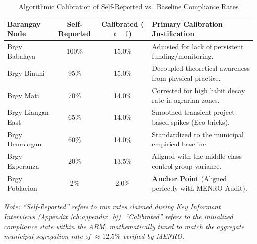 \begin{table}[htbp]
    \centering
    \caption{Algorithmic Calibration of Self-Reported vs.\ Baseline Compliance Rates}
    \label{tab:calibration_data}
    \small
    \begin{tabular}{l c c p{6.5cm}}
        \toprule
        \textbf{Barangay Node} & \textbf{Self-Reported} & \textbf{Calibrated ($t=0$)} & \textbf{Primary Calibration Justification} \\
        \midrule
        Brgy Babalaya     & 100\% & 15.0\% & Adjusted for lack of persistent funding/monitoring. \\
        Brgy Binuni       & 95\%  & 15.0\% & Decoupled theoretical awareness from physical practice. \\
        Brgy Mati         & 70\%  & 14.0\% & Corrected for high habit decay rate in agrarian zones. \\
        Brgy Liangan East & 65\%  & 14.0\% & Smoothed transient project-based spikes (Eco-bricks). \\
        Brgy Demologan    & 60\%  & 14.0\% & Standardized to the municipal empirical baseline. \\
        Brgy Ezperanza    & 20\%  & 13.5\% & Aligned with the middle-class control group variance. \\
        Brgy Poblacion    & 2\%   & 2.0\%  & \textbf{Anchor Point} (Aligned perfectly with MENRO Audit). \\
        \bottomrule
    \end{tabular}
    
    \vspace{1ex}
    \raggedright
    \footnotesize
    \textit{Note: ``Self-Reported'' refers to raw rates claimed during Key Informant Interviews (Appendix \ref{ch:appendix_b}). ``Calibrated'' refers to the initialized compliance state within the ABM, mathematically tuned to match the aggregate municipal segregation rate of $\approx 12.5\%$ verified by MENRO.}
\end{table}

